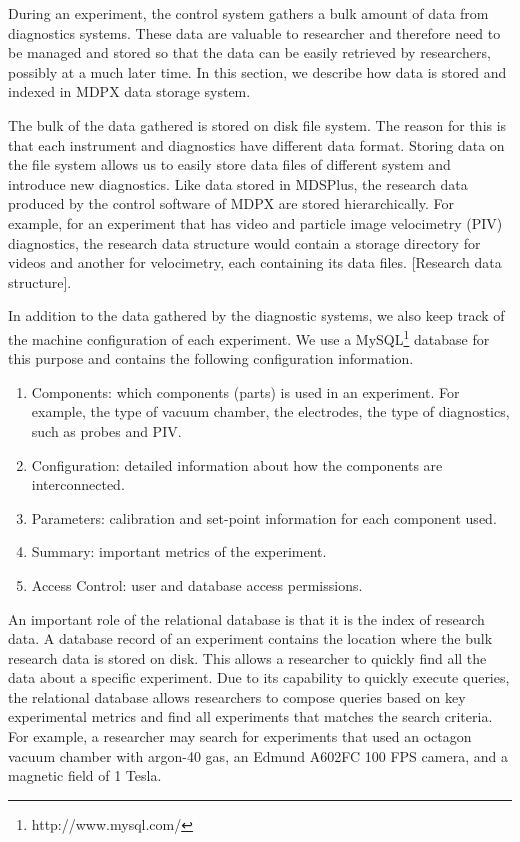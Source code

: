 During an experiment, the control system gathers a bulk amount of data from diagnostics systems. These data are valuable to researcher and therefore need to be managed and stored so that the data can be easily retrieved by researchers, possibly at a much later time. In this section, we describe how data is stored and indexed in MDPX data storage system.

The bulk of the data gathered is stored on disk file system. The reason for this is that each instrument and diagnostics have different data format. Storing data on the file system allows us to easily store data files of different system and introduce new diagnostics. Like data stored in MDSPlus, the research data produced by the control software of MDPX are stored hierarchically. For example, for an experiment that has video and particle image velocimetry (PIV) diagnostics, the research data structure would contain a storage directory for videos and another for velocimetry, each containing its data files. [Research data structure].

In addition to the data gathered by the diagnostic systems, we also keep track of the machine configuration of each experiment. We use a MySQL\footnote{http://www.mysql.com/} database for this purpose and contains the following configuration information.

\begin{enumerate}
\item Components: which components (parts) is used in an experiment. For example, the type of vacuum chamber, the electrodes, the type of diagnostics, such as probes and PIV.
\item Configuration: detailed information about how the components are interconnected.
\item Parameters: calibration and set-point information for each component used. %
\item Summary: important metrics of the experiment.
\item Access Control: user and database access permissions.
\end{enumerate}

An important role of the relational database is that it is the index of research data. A database record of an experiment contains the location where the bulk research data is stored on disk. This allows a researcher to quickly find all the data about a specific experiment. Due to its capability to quickly execute queries, the relational database allows researchers to compose queries based on key experimental metrics and find all experiments that matches the search criteria. For example, a researcher may search for experiments that used an octagon vacuum chamber with argon-40 gas, an Edmund A602FC 100 FPS camera, and a magnetic field of 1 Tesla.

